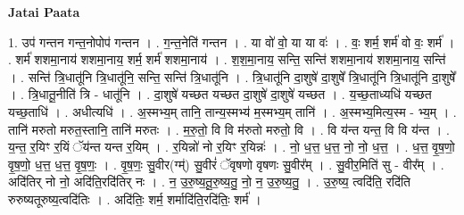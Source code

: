 \documentclass[17pt]{extarticle}
\begin{document}
\textbf{Jatai Paata} \newline

1. उप॑ गन्तन गन्त॒नोपोप॑ गन्तन । . ग॒न्त॒नेति॑ गन्तन । . या वो॑ वो॒ या या वः॑ । . वः॒ शर्म॒ शर्म॑ वो वः॒ शर्म॑ । . शर्म॑ शशमा॒नाय॑ शशमा॒नाय॒ शर्म॒ शर्म॑ शशमा॒नाय॑ । . श॒श॒मा॒नाय॒ सन्ति॒ सन्ति॑ शशमा॒नाय॑ शशमा॒नाय॒ सन्ति॑ । . सन्ति॑ त्रि॒धातू॑नि त्रि॒धातू॑नि॒ सन्ति॒ सन्ति॑ त्रि॒धातू॑नि । . त्रि॒धातू॑नि दा॒शुषे॑ दा॒शुषे᳚ त्रि॒धातू॑नि त्रि॒धातू॑नि दा॒शुषे᳚ । . त्रि॒धातू॒नीति॑ त्रि - धातू॑नि । . दा॒शुषे॑ यच्छत यच्छत दा॒शुषे॑ दा॒शुषे॑ यच्छत । . य॒च्छ॒ताध्यधि॑ यच्छत यच्छ॒ताधि॑ । . अधीत्यधि॑ । . अ॒स्मभ्य॒म् तानि॒ तान्य॒स्मभ्य॑ म॒स्मभ्य॒म् तानि॑ । . अ॒स्मभ्य॒मित्य॒स्म - भ्य॒म् । . तानि॑ मरुतो मरुत॒स्तानि॒ तानि॑ मरुतः । . म॒रु॒तो॒ वि वि म॑रुतो मरुतो॒ वि । . वि य॑न्त यन्त॒ वि वि य॑न्त । . य॒न्त॒ र॒यिꣳ र॒यिं ॅय॑न्त यन्त र॒यिम् । . र॒यिन्नो॑ नो र॒यिꣳ र॒यिन्नः॑ । . नो॒ ध॒त्त॒ ध॒त्त॒ नो॒ नो॒ ध॒त्त॒ । . ध॒त्त॒ वृ॒ष॒णो॒ वृ॒ष॒णो॒ ध॒त्त॒ ध॒त्त॒ वृ॒ष॒णः॒ । . वृ॒ष॒णः॒ सु॒वीर(ग्म्॑) सु॒वीरं॑ ॅवृषणो वृषणः सु॒वीर᳚म् । . सु॒वीर॒मिति॑ सु - वीर᳚म् । . अदि॑तिर् नो नो॒ अदि॑ति॒रदि॑तिर् नः । . न॒ उ॒रु॒ष्य॒तू॒रु॒ष्य॒तु॒ नो॒ न॒ उ॒रु॒ष्य॒तु॒ । . उ॒रु॒ष्य॒ त्वदि॑ति॒ रदि॑ति रुरुष्यतूरुष्य॒त्वदि॑तिः । . अदि॑तिः॒ शर्म॒ शर्मादि॑ति॒रदि॑तिः॒ शर्म॑ । \newline
\end{document}
